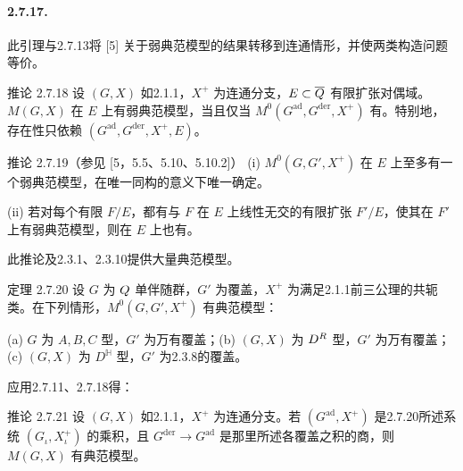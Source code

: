 \paragraph*{2.7.17.} 此引理与2.7.13将 [5] 关于弱典范模型的结果转移到连通情形，并使两类构造问题等价。
\begin{originaltheorem}{推论 2.7.18}
设 $(G,X)$ 如2.1.1，$X^+$ 为连通分支，$E\subset\overline{Q}$ 有限扩张对偶域。$M(G,X)$ 在 $E$ 上有弱典范模型，当且仅当 $M^0(G^{\mathrm{ad}},G^{\mathrm{der}},X^+)$ 有。特别地，存在性只依赖 $(G^{\mathrm{ad}},G^{\mathrm{der}},X^+,E)$。
\end{originaltheorem}
\begin{originaltheorem}{推论 2.7.19（参见 [5，5.5、5.10、5.10.2]）}
(i) $M^0(G,G',X^+)$ 在 $E$ 上至多有一个弱典范模型，在唯一同构的意义下唯一确定。

(ii) 若对每个有限 $F/E$，都有与 $F$ 在 $E$ 上线性无交的有限扩张 $F'/E$，使其在 $F'$ 上有弱典范模型，则在 $E$ 上也有。
\end{originaltheorem}
此推论及2.3.1、2.3.10提供大量典范模型。
\begin{originaltheorem}{定理 2.7.20}
设 $G$ 为 $Q$ 单伴随群，$G'$ 为覆盖，$X^+$ 为满足2.1.1前三公理的共轭类。在下列情形，$M^0(G,G',X^+)$ 有典范模型：

(a) $G$ 为 $A,B,C$ 型，$G'$ 为万有覆盖；(b) $(G,X)$ 为 $D^{R}$ 型，$G'$ 为万有覆盖；(c) $(G,X)$ 为 $D^{\mathbb H}$ 型，$G'$ 为2.3.8的覆盖。
\end{originaltheorem}
应用2.7.11、2.7.18得：
\begin{originaltheorem}{推论 2.7.21}
设 $(G,X)$ 如2.1.1，$X^+$ 为连通分支。若 $(G^{\mathrm{ad}},X^+)$ 是2.7.20所述系统 $(G_\iota,X_\iota^+)$ 的乘积，且 $G^{\mathrm{der}}\to G^{\mathrm{ad}}$ 是那里所述各覆盖之积的商，则 $M(G,X)$ 有典范模型。
\end{originaltheorem}

